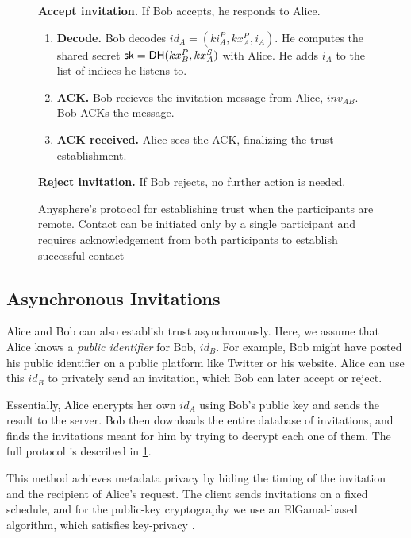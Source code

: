 \begin{figure}[!th]
\begin{framed}
{\begin{hangparas}{1em}{1}
    \medskip

      \textbf{Accept invitation.}
          If Bob accepts, he responds to Alice.
          \begin{enumerate}
              \item \textbf{Decode.} Bob decodes $id_A = (ki_A^P, kx_A^P, i_A)$. He computes the shared secret ${\mathsf{sk}} =  \mathsf{DH}(kx_B^P, kx^S_A)$ with Alice. He adds $i_A$ to the list of indices he listens to.
              \item \textbf{ACK.} Bob recieves the invitation message from Alice, $inv_{AB}$. Bob ACKs the message.
              \item \textbf{ACK received.} Alice sees the ACK, finalizing the trust establishment.
          \end{enumerate}
    \medskip
          
      \textbf{Reject invitation.}
        If Bob rejects, no further action is needed.
  \end{hangparas}
  }
  \end{framed}
  \caption{Anysphere's protocol for establishing trust when the participants are remote. Contact can be initiated only by a single participant and requires acknowledgement from both participants to establish successful contact}
  \label{fig:trust-establishment-async}
\end{figure}


\subsection{Asynchronous Invitations}

Alice and Bob can also establish trust asynchronously. Here, we assume that Alice knows a \textit{public identifier} for Bob, $id_B$. For example, Bob might have posted his public identifier on a public platform like Twitter or his website. Alice can use this $id_B$ to privately send an invitation, which Bob can later accept or reject. 

Essentially, Alice encrypts her own $id_A$ using Bob's public key and sends the result to the server. Bob then downloads the entire database of invitations, and finds the invitations meant for him by trying to decrypt each one of them. The full protocol is described in \cref{fig:trust-establishment-async}.

This method achieves metadata privacy by hiding the timing of the invitation and the recipient of Alice's request. The client sends invitations on a fixed schedule, and for the public-key cryptography we use an ElGamal-based algorithm, which satisfies key-privacy \cite{bellare2001key}.
    
